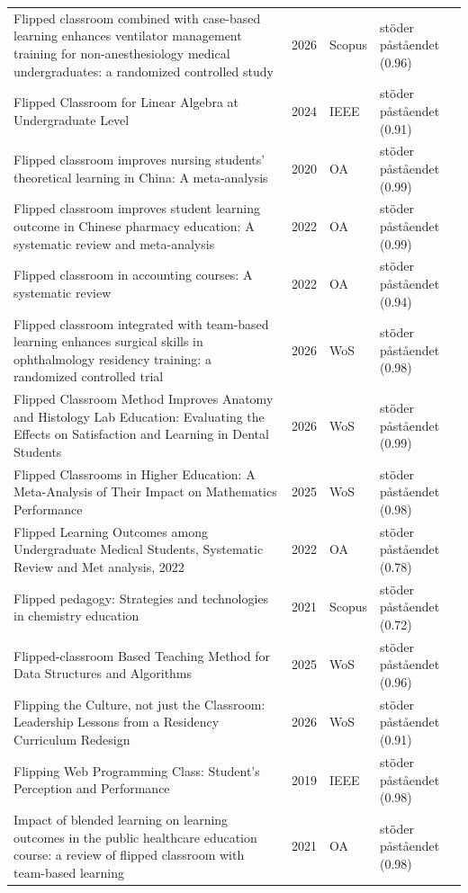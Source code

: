 \begin{longtable}{@{}%
  >{\raggedright\arraybackslash}p{}c%
  >{\raggedright\arraybackslash}p{}%
  >{\raggedright\arraybackslash}p{}@{}}
Flipped classroom combined with case-based learning enhances ventilator management training for non-anesthesiology medical undergraduates: a randomized controlled study & 2026 & Scopus & stöder påståendet (0.96) \\
Flipped Classroom for Linear Algebra at Undergraduate Level & 2024 & IEEE & stöder påståendet (0.91) \\
Flipped classroom improves nursing students' theoretical learning in China: A meta-analysis & 2020 & OA & stöder påståendet (0.99) \\
Flipped classroom improves student learning outcome in Chinese pharmacy education: A systematic review and meta-analysis & 2022 & OA & stöder påståendet (0.99) \\
Flipped classroom in accounting courses: A systematic review & 2022 & OA & stöder påståendet (0.94) \\
Flipped classroom integrated with team-based learning enhances surgical skills in ophthalmology residency training: a randomized controlled trial & 2026 & WoS & stöder påståendet (0.98) \\
Flipped Classroom Method Improves Anatomy and Histology Lab Education: Evaluating the Effects on Satisfaction and Learning in Dental Students & 2026 & WoS & stöder påståendet (0.99) \\
Flipped Classrooms in Higher Education: A Meta-Analysis of Their Impact on Mathematics Performance & 2025 & WoS & stöder påståendet (0.98) \\
Flipped Learning Outcomes among Undergraduate Medical Students, Systematic Review and Met analysis, 2022 & 2022 & OA & stöder påståendet (0.78) \\
Flipped pedagogy: Strategies and technologies in chemistry education & 2021 & Scopus & stöder påståendet (0.72) \\
Flipped-classroom Based Teaching Method for Data Structures and Algorithms & 2025 & WoS & stöder påståendet (0.96) \\
Flipping the Culture, not just the Classroom: Leadership Lessons from a Residency Curriculum Redesign & 2026 & WoS & stöder påståendet (0.91) \\
Flipping Web Programming Class: Student's Perception and Performance & 2019 & IEEE & stöder påståendet (0.98) \\
Impact of blended learning on learning outcomes in the public healthcare education course: a review of flipped classroom with team-based learning & 2021 & OA & stöder påståendet (0.98) \\

\end{longtable}
